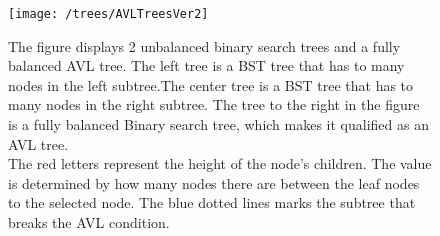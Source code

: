 \begin{figure}
	\centering
	\texttt{[image: /trees/AVLTreesVer2]}	
	\caption{The figure displays 2 unbalanced binary search trees and a fully balanced AVL tree. The left tree is a BST tree that has to many nodes in the left subtree.The center tree is a BST tree that has to many nodes in the right subtree. The tree to the right in the figure is a fully balanced Binary search tree, which makes it qualified as an AVL tree. \\The red letters represent the height of the node's children. The value is determined by how many nodes there are between the leaf nodes to the selected node. The blue dotted lines marks the subtree that breaks the AVL condition.}
	\label{fig:AVLTrees}
\end{figure}
